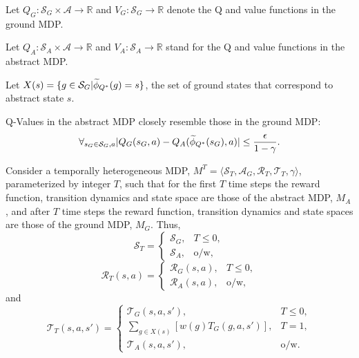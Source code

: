 Let $Q_G: \mathcal{S}_G \times \mathcal{A} \rightarrow \mathbb{R}$ and $V_G: \mathcal{S}_G \rightarrow \mathbb{R}$ denote the Q and value functions in the ground \ac{MDP}.

Let $Q_A: \mathcal{S}_A \times \mathcal{A} \rightarrow \mathbb{R}$ and $V_A: \mathcal{S}_A \rightarrow \mathbb{R}$  stand for the Q and value functions in the abstract \ac{MDP}.


Let $X(s) = \{g \in \mathcal{S}_G | \widetilde \phi_{Q^*}(g) = s\}$, the set of ground states that correspond to abstract state $s$.

\begin{clm}
Q-Values in the abstract \ac{MDP} closely resemble those in the ground \ac{MDP}:
\begin{equation}
\label{eq:Q*Claim1}
\forall_{s_G \in \mathcal{S}_G, a} |Q_G(s_G, a) - Q_A(\widetilde \phi_{Q^*}(s_G), a)| \leq \frac{\epsilon}{1-\gamma}.
\end{equation}
\end{clm}

Consider a temporally heterogeneous \ac{MDP}, $M^T = \langle \mathcal{S}_T, \mathcal{A}_G, \mathcal{R}_T, \mathcal{T}_T, \gamma \rangle$, parameterized by integer $T$, such that for the first $T$ time steps the reward function, transition dynamics and state space are those of the abstract MDP, $M_A$, and after $T$ time steps the reward function, transition dynamics and state spaces are those of the ground MDP, $M_G$. Thus,
\begin{equation}
\mathcal{S}_T = \begin{cases}
\mathcal{S}_G,& T \leq 0, \\
\mathcal{S}_A,& \text{o/w},
\end{cases}
\end{equation}
\begin{equation}
\mathcal{R}_T(s,a) = \begin{cases}
\mathcal{R}_G(s,a),& T \leq 0, \\
\mathcal{R}_A(s, a),& \text{o/w},
\end{cases}
\end{equation}
and
\begin{equation}
\mathcal{T}_T(s,a,s') = \begin{cases}
\mathcal{T}_G(s,a,s'),& T \leq 0, \\
\underset{{g \in X(s)}}{\sum}\left[w(g)T_G(g, a, s')\right],& T = 1, \\
\mathcal{T}_A(s,a,s'),& \text{o/w}.
\end{cases}
\end{equation}

